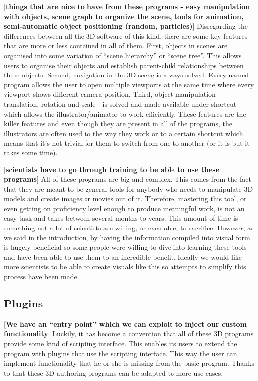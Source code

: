 \documentclass[
  digital, %
  table,   %
  nolof,     %
  nolot,     %
]{fithesis3}
\begin{document}
[\textbf{things that are nice to have from these programs - easy manipulation with objects, scene graph to organize the scene, tools for animation, semi-automatic object positioning (random, particles)}]
Disregarding the differences between all the 3D software of this kind, there are some key features that are more or less contained in all of them. First, objects in scenes are organised into some variation of ``scene hierarchy'' or ``scene tree''. This allows users to organise their objects and establish parent-child relationships between these objects. Second, navigation in the 3D scene is always solved. Every named program allows the user to open multiple viewports at the same time where every viewport shows different camera position. Third, object manipulation - translation, rotation and scale - is solved and made available under shortcut which allows the illustrator/animator to work efficiently.
These features are the killer features and even though they are present in all of the programs, the illustrators are often used to the way they work or to a certain shortcut which means that it's not trivial for them to switch from one to another (or it is but it takes some time).

[\textbf{scientists have to go through training to be able to use these programs}]
All of these programs are big and complex. This comes from the fact that they are meant to be general tools for anybody who needs to manipulate 3D models and create images or movies out of it. Therefore, mastering this tool, or even getting on proficiency level enough to produce meaningful work, is not an easy task and takes between several months to years. This amount of time is something not a lot of scientists are willing, or even able, to sacrifice. However, as we said in the introduction, by having the information compiled into visual form is hugely beneficial so some people were willing to dive into learning these tools and have been able to use them to an incredible benefit. Ideally we would like more scientists to be able to create visuals like this so attempts to simplify this process have been made.

\subsection{Plugins}
[\textbf{We have an ``entry point'' which we can exploit to inject our custom functionality}]
Luckily, it has become a convention that all of these 3D programs provide some kind of scripting interface. This enables its users to extend the program with plugins that use the scripting interface. This way the user can implement functionality that he or she is missing from the basic program. Thanks to that these 3D authoring programs can be adapted to more use cases.
\end{document}
